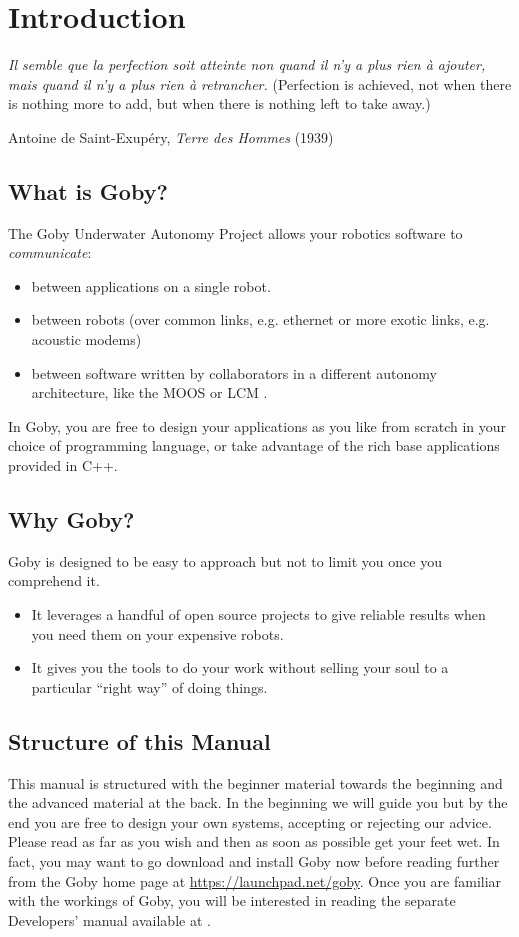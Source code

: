 \chapter{Introduction}
\setlength{\epigraphwidth}{0.5\textwidth}
\epigraph{\textit{Il semble que la perfection soit atteinte non quand il n'y a plus rien à ajouter, mais quand il n'y a plus rien à retrancher.} (Perfection is achieved, not when there is nothing more to add, but when there is nothing left to take away.)}{Antoine de Saint-Exupéry, \textit{Terre des Hommes} (1939)}

\section{What is Goby?}


The Goby Underwater Autonomy Project allows your robotics software to \textit{communicate}: 
\begin{itemize}
\item between \glspl{application} on a single robot.
\item between robots (over common links, e.g. ethernet or more exotic links, e.g. acoustic modems)
\item between software written by collaborators in a different \gls{autonomy architecture}, like the MOOS \cite{moos} or LCM \cite{lcm}. 
\end{itemize}

In Goby, you are free to design your applications as you like from scratch in your choice of programming language, or take advantage of the rich base applications provided in C++.

\section{Why Goby?}

Goby is designed to be easy to approach but not to limit you once you comprehend it. 
\begin{itemize}
\item It leverages a handful of open source projects to give reliable results when you need them on your expensive robots. 
\item It gives you the tools to do your work without selling your soul to a particular ``right way'' of doing things. 
\end{itemize}

\section{Structure of this Manual}
This manual is structured with the beginner material towards the beginning and the advanced material at the back. 
In the beginning we will guide you but by the end you are free to design your own systems, accepting or rejecting our advice. Please read as far as you wish and then as soon as possible get your feet wet. In fact, you may want to go download and install Goby now before reading further from the Goby home page at \url{https://launchpad.net/goby}. Once you are familiar with the workings of Goby, you will be interested in reading the separate Developers' manual available at \cite{goby-doc}.

